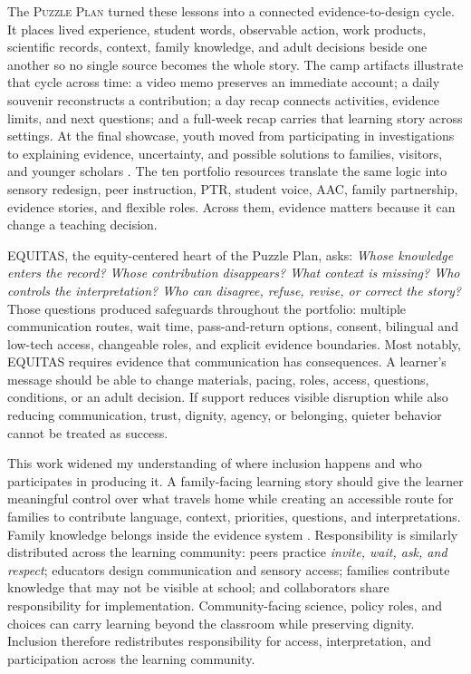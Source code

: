 \documentclass[11pt]{article}
\newcommand{\toolsection}[1]{%
  \Needspace{4\baselineskip}
  \vspace{0.065in}\noindent{\normalsize\bfseries\color{PrimaryRed}#1}
  \par\vspace{0.02in}
}
\begin{document}
The \textsc{Puzzle Plan} turned these lessons into a connected evidence-to-design cycle. It places lived experience, student words, observable action, work products, scientific records, context, family knowledge, and adult decisions beside one another so no single source becomes the whole story. The camp artifacts illustrate that cycle across time: a video memo preserves an immediate account; a daily souvenir reconstructs a contribution; a day recap connects activities, evidence limits, and next questions; and a full-week recap carries that learning story across settings. At the final showcase, youth moved from participating in investigations to explaining evidence, uncertainty, and possible solutions to families, visitors, and younger scholars \citep{campEvidence2026}. The ten portfolio resources translate the same logic into sensory redesign, peer instruction, PTR, student voice, AAC, family partnership, evidence stories, and flexible roles. Across them, evidence matters because it can change a teaching decision.

\textsc{EQUITAS}, the equity-centered heart of the Puzzle Plan, asks: \textit{Whose knowledge enters the record? Whose contribution disappears? What context is missing? Who controls the interpretation? Who can disagree, refuse, revise, or correct the story?} Those questions produced safeguards throughout the portfolio: multiple communication routes, wait time, pass-and-return options, consent, bilingual and low-tech access, changeable roles, and explicit evidence boundaries. Most notably, EQUITAS requires evidence that communication has consequences. A learner's message should be able to change materials, pacing, roles, access, questions, conditions, or an adult decision. If support reduces visible disruption while also reducing communication, trust, dignity, agency, or belonging, quieter behavior cannot be treated as success.

\toolsection{Families, Community, and Revision Commitments}

This work widened my understanding of where inclusion happens and who participates in producing it. A family-facing learning story should give the learner meaningful control over what travels home while creating an accessible route for families to contribute language, context, priorities, questions, and interpretations. Family knowledge belongs inside the evidence system \citep{zacarian2015community}. Responsibility is similarly distributed across the learning community: peers practice \textit{invite, wait, ask, and respect}; educators design communication and sensory access; families contribute knowledge that may not be visible at school; and collaborators share responsibility for implementation. Community-facing science, policy roles, and choices can carry learning beyond the classroom while preserving dignity. Inclusion therefore redistributes responsibility for access, interpretation, and participation across the learning community.
\end{document}
